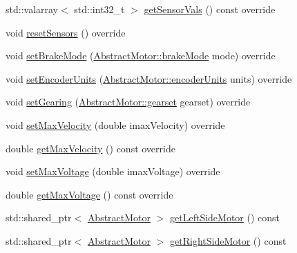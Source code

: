 \begin{DoxyCompactItemize}
std\+::valarray$<$ std\+::int32\+\_\+t $>$ \mbox{\hyperlink{classokapi_1_1SkidSteerModel_a850e4de7ab3a30a354ac39f30a1e8603}{get\+Sensor\+Vals}} () const override
\item 
void \mbox{\hyperlink{classokapi_1_1SkidSteerModel_af8885fc16e654eafa872dd7c760591cf}{reset\+Sensors}} () override
\item 
void \mbox{\hyperlink{classokapi_1_1SkidSteerModel_a84c100815058f4dcdc958b3349713f73}{set\+Brake\+Mode}} (\mbox{\hyperlink{classokapi_1_1AbstractMotor_a132e0485dbb59a60c3f934338d8fa601}{Abstract\+Motor\+::brake\+Mode}} mode) override
\item 
void \mbox{\hyperlink{classokapi_1_1SkidSteerModel_a8922c028a9f09893061938fe50fb2a79}{set\+Encoder\+Units}} (\mbox{\hyperlink{classokapi_1_1AbstractMotor_ae811cd825099f2defadeb1b7f7e7764c}{Abstract\+Motor\+::encoder\+Units}} units) override
\item 
void \mbox{\hyperlink{classokapi_1_1SkidSteerModel_ad890989e345cfd7455436bc5dd6efdcc}{set\+Gearing}} (\mbox{\hyperlink{classokapi_1_1AbstractMotor_a88aaa6ea2fa10f5520a537bbf26774d5}{Abstract\+Motor\+::gearset}} gearset) override
\item 
void \mbox{\hyperlink{classokapi_1_1SkidSteerModel_a4beda353f201fa72fc8d31f47a08d473}{set\+Max\+Velocity}} (double imax\+Velocity) override
\item 
double \mbox{\hyperlink{classokapi_1_1SkidSteerModel_a7e2fcfb65e940ea4d71780966b4b5b68}{get\+Max\+Velocity}} () const override
\item 
void \mbox{\hyperlink{classokapi_1_1SkidSteerModel_ad4dc0f8e3877b23ffb8ae58903bdffb7}{set\+Max\+Voltage}} (double imax\+Voltage) override
\item 
double \mbox{\hyperlink{classokapi_1_1SkidSteerModel_ad4849d18c3a244eb60e1056860a3c4cf}{get\+Max\+Voltage}} () const override
\item 
std\+::shared\+\_\+ptr$<$ \mbox{\hyperlink{classokapi_1_1AbstractMotor}{Abstract\+Motor}} $>$ \mbox{\hyperlink{classokapi_1_1SkidSteerModel_a3f1813ada8205396c35abccbc0c9ff21}{get\+Left\+Side\+Motor}} () const
\item 
std\+::shared\+\_\+ptr$<$ \mbox{\hyperlink{classokapi_1_1AbstractMotor}{Abstract\+Motor}} $>$ \mbox{\hyperlink{classokapi_1_1SkidSteerModel_a0c58a580708b864d8c4391c7045e590b}{get\+Right\+Side\+Motor}} () const
\end{DoxyCompactItemize}

